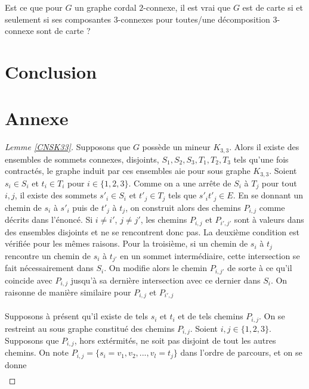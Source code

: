 \documentclass{scrartcl}
\begin{document}
\begin{flushleft}
\begin{quest}
    Est ce que pour $G$ un graphe cordal $2$-connexe, il est vrai que $G$ est de carte si et seulement si ses composantes $3$-connexes pour
    toutes/une décomposition $3$-connexe sont de carte ?
\end{quest}

\section*{Conclusion}

\section*{Annexe}

\begin{proof}[Lemme \ref{CNSK33}]
    Supposons que $G$ possède un mineur $K_{3,3}$. Alors il existe des ensembles de sommets connexes, disjoints, $S_1, S_2, S_3, T_1, T_2, T_3$
    tels qu'une fois contractés, le graphe induit par ces ensembles aie pour sous graphe $K_{3,3}$. Soient $s_i \in S_i$ et $t_i \in T_i$
    pour $i \in \{1, 2, 3\}$. Comme on a une arrête de $S_i$ à $T_j$ pour tout $i,j$, il existe des sommets $s'_i \in S_i$ et $t'_j \in T_j$
    tels que $s'_i t'_j \in E$. En se donnant un chemin de $s_i$ à $s'_i$ puis de $t'_j$ à $t_j$, on construit alors des chemins
    $P_{i,j}$ comme décrits dans l'énoncé. Si $i \neq i'$, $j \neq j'$, les chemins $P_{i,j}$ et $P_{i',j'}$ sont à valeurs dans des
    ensembles disjoints et ne se rencontrent donc pas. La deuxième condition est vérifiée pour les mêmes raisons. Pour la troisième,
    si un chemin de $s_i$ à $t_j$ rencontre un chemin de $s_i$ à $t_{j'}$ en un sommet intermédiaire, cette intersection se fait nécessairement
    dans $S_i$. On modifie alors le chemin $P_{i,j'}$ de sorte à ce qu'il coincide avec $P_{i,j}$ jusqu'à sa dernière intersection avec ce dernier
    dans $S_i$. On raisonne de manière similaire pour $P_{i,j}$ et $P_{i',j}$
    \\~\\
    Supposons à présent qu'il existe de tels $s_i$ et $t_i$ et de tels chemins $P_{i,j}$. On se restreint au sous graphe constitué des
    chemins $P_{i,j}$. Soient $i,j \in \{1,2,3\}$.
    Supposons que $P_{i,j}$, hors extérmités, ne soit pas disjoint de tout les autres chemins. On note
    $P_{i,j} = \{s_i = v_1, v_2, ..., v_l = t_j\}$ dans l'ordre de parcours, et on se donne
    \begin{equation*}
    \begin{split}

\end{split}
\end{equation*}
\end{proof}
\end{flushleft}
\end{document}

